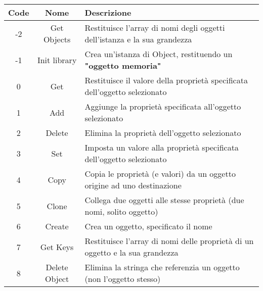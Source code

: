 \documentclass[a4paper]{article}
\begin{document}
\begin{tabular}{ |c|c|p{11.2cm}| }
  \hline
  \textbf{Code} & \textbf{Nome} & \textbf{Descrizione} \\ \hline
  -2 & Get Objects & Restituisce l'array di nomi degli oggetti dell'istanza e la sua grandezza \\ \hline
  -1 & Init library & Crea un'istanza di Object, restituendo un \textbf{"oggetto memoria"} \\ \hline
   0 & Get & Restituisce il valore della proprietà specificata dell'oggetto selezionato \\ \hline
   1 & Add & Aggiunge la proprietà specificata all'oggetto selezionato \\ \hline
   2 & Delete & Elimina la proprietà dell'oggetto selezionato \\ \hline
   3 & Set & Imposta un valore alla proprietà specificata dell'oggetto selezionato \\ \hline
   4 & Copy & Copia le proprietà (e valori) da un oggetto origine ad uno destinazione \\ \hline
   5 & Clone & Collega due oggetti alle stesse proprietà (due nomi, solito oggetto) \\ \hline
   6 & Create & Crea un oggetto, specificato il nome \\ \hline
   7 & Get Keys & Restituisce l'array di nomi delle proprietà di un oggetto e la sua grandezza\\ \hline
   8 & Delete Object & Elimina la stringa che referenzia un oggetto (non l'oggetto stesso) \\ \hline
\end{tabular}
\\
\end{document}
